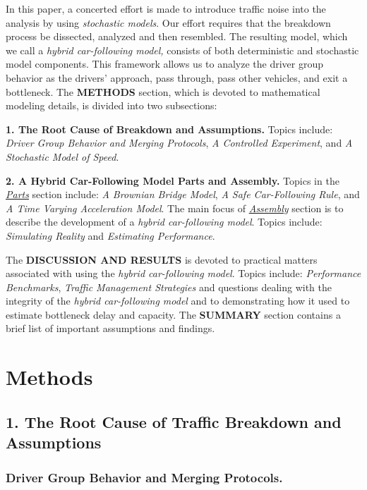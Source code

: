 \documentclass[Proceedings]{ascelike}
\begin{document}
In this paper, a concerted effort is made to introduce traffic noise into the analysis by using \emph{stochastic models}. Our effort requires that the breakdown process be dissected, analyzed and then resembled. The resulting model, which we call a \emph{hybrid car-following model,} consists of both deterministic and stochastic model components. This framework allows us to analyze the driver group behavior as the drivers' approach, pass through, pass other vehicles, and exit a bottleneck. The  \textbf{METHODS} section, which is devoted to mathematical modeling details,  is divided into two subsections:
\begin{description}
    \item \textbf{1. The Root Cause of Breakdown and Assumptions.} Topics include:  \emph{Driver Group Behavior and Merging Protocols}, \emph{A Controlled Experiment}, and \emph{A Stochastic Model of Speed}. 
    \item \textbf{2. A Hybrid Car-Following Model Parts and Assembly.} Topics in the \underline{\underline{\emph{Parts}}} section include: \emph{A Brownian Bridge Model}, \emph{A Safe Car-Following Rule}, and \emph{A Time Varying Acceleration Model}. The main focus of \underline{\emph{Assembly}} section is  to describe  the development of a \emph{hybrid car-following model}.  Topics include: \emph{Simulating Reality} and \emph{Estimating Performance}.
\end{description}
The \textbf{DISCUSSION AND RESULTS} is devoted to practical matters associated with using the \emph{hybrid car-following model}. Topics include: \emph{Performance Benchmarks}, \emph{Traffic Management Strategies} and questions dealing with the integrity of the \emph{hybrid car-following model} and to demonstrating how  it used to estimate bottleneck delay and capacity. The \textbf{SUMMARY} section contains a brief list of  important assumptions and findings.





\section{Methods}

\subsection{1. The Root Cause of Traffic Breakdown and Assumptions} 

\subsubsection{Driver Group Behavior and Merging Protocols.} 
\end{document}
